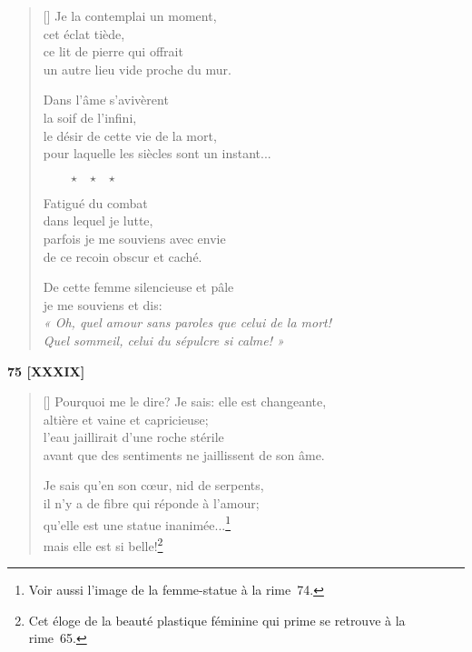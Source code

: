 \documentclass[a4paper,12pt]{book}
\begin{document}
\begin{verse}[\versewidth]
  Je la contemplai un moment, \\
  cet éclat tiède, \\
  ce lit de pierre qui offrait \\
  un autre lieu vide proche du mur.

  Dans l'âme s'avivèrent \\
  la soif de l'infini, \\
  le désir de cette vie de la mort, \\
  pour laquelle les siècles sont un instant...

  $\ \ \ \ \ \ \ \ \ \star \ \ \ \star \ \ \ \star$

  Fatigué du combat \\
  dans lequel je lutte, \\
  parfois je me souviens avec envie \\
  de ce recoin obscur et caché.

  De cette femme silencieuse et pâle \\
  je me souviens et dis: \\
  \emph{« Oh, quel amour sans paroles que celui de la mort! \\
    Quel sommeil, celui du sépulcre si calme! »}
\end{verse}

\bigskip

\begin{center}
  \textbf{75 [XXXIX]}
\end{center}

\settowidth{\versewidth}{Pourquoi me le dire? Je sais: elle est changeante,}

\begin{verse}[\versewidth]
  Pourquoi me le dire? Je sais: elle est changeante, \\
  altière et vaine et capricieuse; \\
  l'eau jaillirait d'une roche stérile \\
  avant que des sentiments ne jaillissent de son âme.

  Je sais qu'en son cœur, nid de serpents, \\
  il n'y a de fibre qui réponde à l'amour; \\
  qu'elle est une statue inanimée...\footnote{Voir aussi l'image de la
  femme-statue à la rime~74.} \\
  mais elle est si belle!\footnote{Cet éloge de la beauté plastique
  féminine qui prime se retrouve à la rime~65.}
\end{verse}
\end{document}
